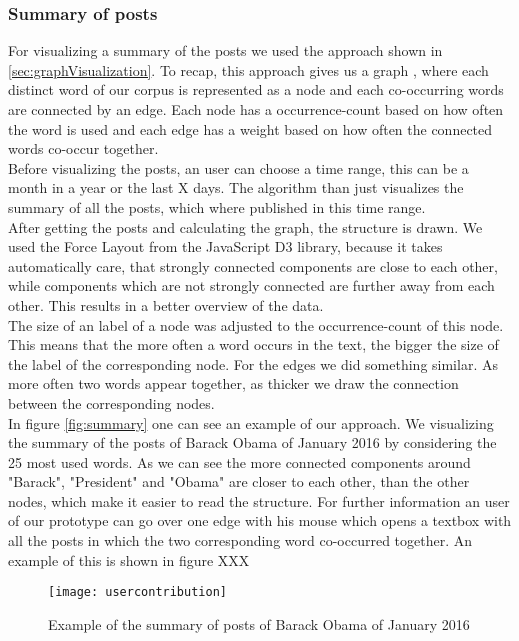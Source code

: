 \subsubsection{Summary of posts}
For visualizing a summary of the posts we used the approach shown in \ref{sec:graphVisualization}. To recap, this approach gives us a graph , where each distinct word of our corpus is represented as  a node and each co-occurring words are connected by an edge. Each node has a occurrence-count based on how often the word is used and each edge has a weight based on how often the connected words co-occur together. \\
Before visualizing the posts, an user can choose a time range, this can be a month in a year or the last X days. The algorithm than just visualizes the summary of all the posts, which where published in this time range. \\
After getting the posts and calculating the graph, the structure is drawn. We used the Force Layout from the JavaScript D3 library, because it  takes automatically care, that strongly connected components are close to each other, while components which are not strongly connected are further away from each other. This results in a better overview of the data. \\
The size of an label of a node was adjusted to the occurrence-count of this node. This means that the more often a word occurs in the text, the bigger the size of the label of the corresponding node. For the edges we did something similar. As more often two words appear together, as thicker we draw the connection between the corresponding nodes. \\
In  figure \ref{fig:summary} one can see an example of our approach. We visualizing the summary of the posts of Barack Obama of January 2016 by considering the 25 most used words. As we can see the more connected components around "Barack", "President" and "Obama" are closer to each other, than the other nodes, which make it easier to read the structure. For further information an user of our prototype can go over one edge with his mouse which opens a textbox with all the posts in which the two corresponding word co-occurred together. An example of this is shown in figure XXX 

\begin{figure}[t]
	\centering
	\texttt{[image: usercontribution]}
	\caption[ContributonOverTime]{Example of the summary of posts of Barack Obama of January 2016}
	\label{fig:graphVisualization}
\end{figure}

